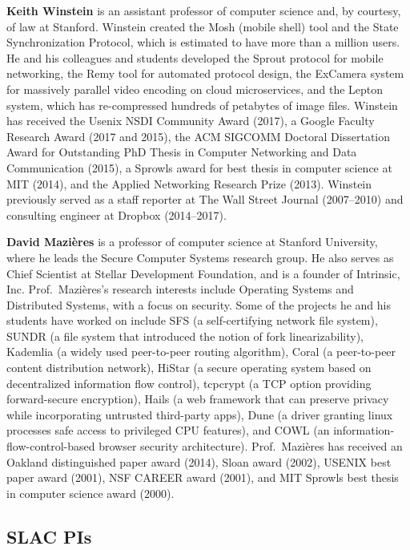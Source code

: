 \documentclass[10pt]{article}
\newcommand{\slim}{\vspace{0.5\baselineskip}}
\begin{document}
\noindent \textbf{Keith Winstein} is an assistant professor of
computer science and, by courtesy, of law at Stanford. Winstein
created the Mosh (mobile shell) tool and the State Synchronization
Protocol, which is estimated to have more than a million users. He and
his colleagues and students developed the Sprout protocol for mobile
networking, the Remy tool for automated protocol design, the ExCamera
system for massively parallel video encoding on cloud microservices,
and the Lepton system, which has re-compressed hundreds of petabytes
of image files. Winstein has received the Usenix NSDI Community Award
(2017), a Google Faculty Research Award (2017 and 2015), the ACM
SIGCOMM Doctoral Dissertation Award for Outstanding PhD Thesis in
Computer Networking and Data Communication (2015), a Sprowls award for
best thesis in computer science at MIT (2014), and the Applied
Networking Research Prize (2013). Winstein previously served as a
staff reporter at The Wall Street Journal (2007--2010) and consulting
engineer at Dropbox (2014--2017).

\slim

\noindent \textbf{David Mazi\`{e}res} is a professor of computer
science at Stanford University, where he leads the Secure Computer
Systems research group. He also serves as Chief Scientist at Stellar
Development Foundation, and is a founder of Intrinsic,
Inc. Prof.~Mazi\`{e}res's research interests include Operating Systems
and Distributed Systems, with a focus on security. Some of
the projects he and his students have worked on include SFS (a
self-certifying network file system), SUNDR (a file system that
introduced the notion of fork linearizability), Kademlia (a widely
used peer-to-peer routing algorithm), Coral (a peer-to-peer content
distribution network), HiStar (a secure operating system based on
decentralized information flow control), tcpcrypt (a TCP option
providing forward-secure encryption), Hails (a web framework that can
preserve privacy while incorporating untrusted third-party apps), Dune
(a driver granting linux processes safe access to privileged CPU
features), and COWL (an information-flow-control-based browser
security architecture). Prof.~Mazi\`{e}res has received an Oakland distinguished paper award (2014), Sloan award
(2002), USENIX best paper award (2001), NSF CAREER award (2001), and MIT
Sprowls best thesis in computer science award (2000).

\subsection{SLAC PIs}
\end{document}
